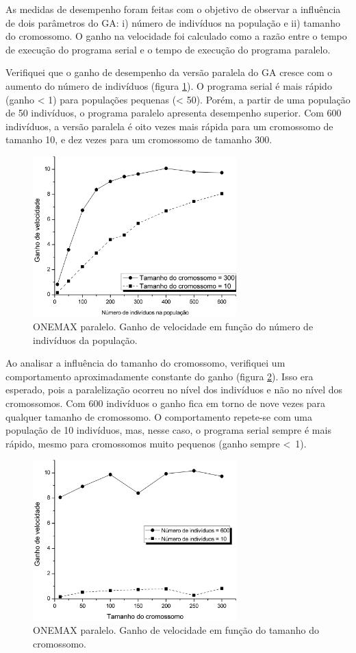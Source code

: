 	As medidas de desempenho foram feitas com o objetivo de observar a influência de dois parâmetros do GA: i) número de indivíduos na população e ii) tamanho do cromossomo. O ganho na velocidade foi calculado como a razão entre o tempo de execução do programa serial e o tempo de execução do programa paralelo.

Verifiquei que o ganho de desempenho da versão paralela do GA cresce com o aumento do número de indivíduos (figura \ref{fig:ganhoNumInd}). O programa serial é mais rápido (ganho < 1) para populações pequenas (< 50). Porém, a partir de uma população de 50 indivíduos, o programa paralelo apresenta desempenho superior. Com 600 indivíduos, a versão paralela é oito vezes mais rápida para um cromossomo de tamanho 10, e dez vezes para um cromossomo de tamanho 300. 

\begin{figure}[htbp]
	\centering
		\includegraphics[width=0.70\textwidth]{figs/resultados/onemax/ganhoNumInd.png}
	\caption{ONEMAX paralelo. Ganho de velocidade em função do número de indivíduos da população.}
	\label{fig:ganhoNumInd}
\end{figure}

	Ao analisar a influência do tamanho do cromossomo, verifiquei um comportamento aproximadamente constante do ganho (figura \ref{fig:ganhoTamCromo}). Isso era esperado, pois a paralelização ocorreu no nível dos indivíduos e não no nível dos cromossomos. Com 600 indivíduos o ganho fica em torno de nove vezes para qualquer tamanho de cromossomo. O comportamento repete-se com uma população de 10 indivíduos, mas, nesse caso, o programa serial sempre é mais rápido, mesmo para cromossomos muito pequenos (ganho sempre \mbox{< 1}). 
		
	\begin{figure}[htbp]
		\centering
			\includegraphics[width=0.70\textwidth]{figs/resultados/onemax/ganhoTamCromo.png}
		\caption{ONEMAX paralelo. Ganho de velocidade em função do tamanho do cromossomo.}
		\label{fig:ganhoTamCromo}
	\end{figure}